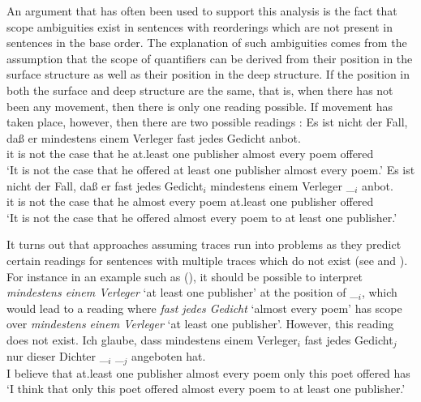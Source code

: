 \addlines
{}%
An argument that has often been used to support this analysis is the fact that scope ambiguities
exist in sentences with reorderings which are not present in sentences in the base order. The explanation of such ambiguities comes from the assumption that the scope of quantifiers
can be derived from their position in the surface structure as well as their position in the deep structure. If the position in both the surface
and deep structure are the same, that is, when there has not been any movement, then there is only one reading possible. If movement has taken place,
however, then there are two possible readings \citep[\page ]{Frey93a}:
\eal
\ex 
\gll Es ist nicht der Fall, daß er mindestens einem Verleger fast jedes Gedicht anbot.\\
     it is not the case that he at.least one publisher almost every poem offered\\
\glt `It is not the case that he offered at least one publisher almost every poem.'
\ex 
\gll Es ist nicht der Fall, daß er fast jedes Gedicht$_i$ mindestens einem Verleger \_$_i$ anbot.\\
	 it is not the case that he almost every poem at.least one publisher {} offered\\
\glt `It is not the case that he offered almost every poem to at least one publisher.'
\zl

\noindent
It turns out that approaches assuming traces run into problems as they predict certain readings for sentences with multiple traces which
do not exist (see \citealp[]{Kiss2001a} and \citealp[Section~2.6]{Fanselow2001a}). 
For instance in an example such as (), it should be possible to interpret \emph{mindestens einem Verleger} `at least one publisher' at
the position of \_$_i$, which would lead to a reading where \emph{fast jedes Gedicht} `almost every poem' has scope over \emph{mindestens einem Verleger} 
`at least one publisher'. However, this reading does not exist.
\ea
\gll Ich glaube, dass mindestens einem Verleger$_i$ fast jedes Gedicht$_j$ nur dieser Dichter \_$_i$ \_$_j$ angeboten hat.\\
	 I believe that at.least one publisher almost every poem only this poet {} {} offered has\\
\glt `I think that only this poet offered almost every poem to at least one publisher.'
\z

